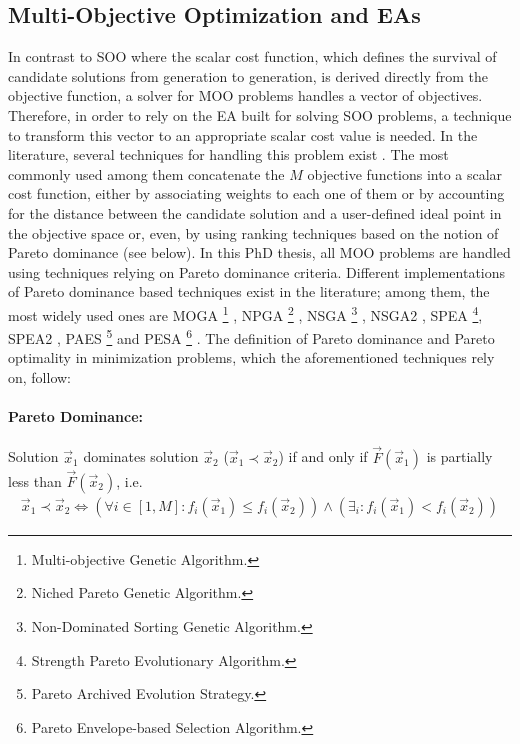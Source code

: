 \subsection{Multi-Objective Optimization and EAs}
\label{MOOini}
In contrast to SOO where the scalar cost function, which defines the survival of candidate solutions from generation to generation, is derived directly from the objective function, a solver for MOO problems handles a vector of objectives. Therefore, in order to rely on the EA built for solving SOO problems, a technique to transform this vector to an appropriate scalar cost value is needed. In the literature, several techniques for handling this problem exist \cite{CoCo99,coe02,Miett99}. The most commonly used among them concatenate the $M$ objective functions into a scalar cost function, either by associating weights to each one of them or by accounting for the distance between the candidate solution and a user-defined ideal point in the objective space or, even, by using ranking techniques based on the notion of Pareto dominance (see below). In this PhD thesis, all MOO problems are handled using techniques relying on Pareto dominance criteria. Different implementations of Pareto dominance based techniques exist in the literature; among them, the most widely used ones are MOGA \footnote{Multi-objective Genetic Algorithm.} \cite{Fon93}, NPGA \footnote{Niched Pareto Genetic Algorithm.} \cite{horn94}, NSGA \footnote{Non-Dominated Sorting Genetic Algorithm.} \cite{Sri1995}, NSGA2 \cite{Deb00a}, SPEA \footnote{Strength Pareto Evolutionary Algorithm.}\cite{ZiTh98}, SPEA2 \cite{Zitz02}, PAES \footnote{Pareto Archived Evolution Strategy.} \cite{knowles99} and PESA \footnote{Pareto Envelope-based Selection Algorithm.} \cite{corne00}. The definition of Pareto dominance and Pareto optimality in minimization problems, which the aforementioned techniques rely on, follow:

\paragraph{Pareto Dominance:} Solution $\vec{x}_1$ dominates solution $\vec{x}_2$ ($\vec{x}_1\prec\vec{x}_2$) if and only if $\vec{F}(\vec{x}_1)$ is partially less than $\vec{F}(\vec{x}_2)$, i.e.
\begin{eqnarray}
    \vec{x}_1\prec\vec{x}_2 \Leftrightarrow (\forall i \in[1,M] :  f_i(\vec{x}_1) \leq f_i(\vec{x}_2))\wedge (\exists _i : f_i(\vec{x}_1) < f_i(\vec{x}_2))
   \label{pareto_eq} 
\end{eqnarray}

